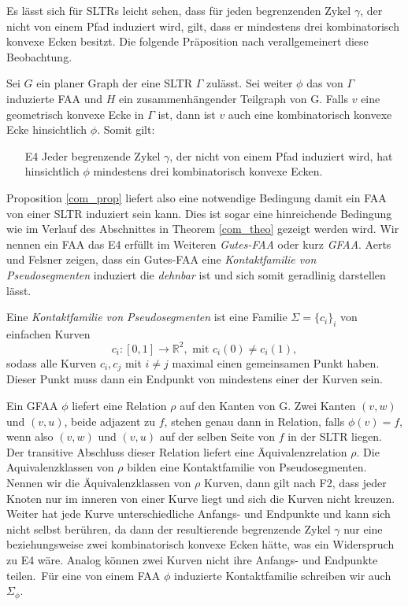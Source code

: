 Es lässt sich für SLTRs leicht sehen, dass für jeden begrenzenden Zykel $\gamma$, der nicht von einem Pfad induziert wird, gilt, dass er mindestens drei kombinatorisch konvexe Ecken besitzt. Die folgende Präposition nach \cite[Prop 2.2, Prop 2.4]{af13} verallgemeinert diese Beobachtung.

\begin{proposition}\label{com_prop}
Sei $G$ ein planer Graph der eine SLTR $\Gamma$ zulässt. Sei weiter $\phi$ das von $\Gamma$ induzierte FAA und $H$ ein zusammenhängender Teilgraph von G. Falls $v$ eine geometrisch konvexe Ecke in $\Gamma$ ist, dann ist $v$ auch eine kombinatorisch konvexe Ecke hinsichtlich $\phi$. Somit gilt:
\begin{itemize}
\item [E4] Jeder begrenzende Zykel $\gamma$, der nicht von einem Pfad induziert wird, hat hinsichtlich $\phi$ mindestens drei kombinatorisch konvexe Ecken.
\end{itemize}

\end{proposition}

Proposition \ref{com_prop} liefert also eine notwendige Bedingung damit ein FAA von einer SLTR induziert sein kann. Dies ist sogar eine hinreichende Bedingung wie im Verlauf des Abschnittes in Theorem \ref{com_theo} gezeigt werden wird. Wir nennen ein FAA das E4 erfüllt im Weiteren \textit{Gutes-FAA} oder kurz \textit{GFAA}. Aerts und Felsner zeigen, dass ein Gutes-FAA eine \textit{Kontaktfamilie von Pseudosegmenten} induziert die \textit{dehnbar} ist und sich somit geradlinig darstellen lässt.

\begin{definition}

Eine \textit{Kontaktfamilie von Pseudosegmenten} ist eine Familie $\Sigma = \{c_i\}_i$ von einfachen Kurven $$c_i:[0,1] \to \mathbb{R}^2, \text{ mit } c_i(0) \neq c_i(1),$$ sodass alle Kurven $c_i,c_j$ mit $i \neq j$ maximal einen gemeinsamen Punkt haben. Dieser Punkt muss dann ein Endpunkt von mindestens einer der Kurven sein.

\end{definition}

Ein GFAA $\phi$ liefert eine Relation $\rho$ auf den Kanten von G. Zwei Kanten $(v,w)$ und $(v,u)$, beide adjazent zu $f$, stehen genau dann in Relation, falls $\phi(v)=f$, wenn also $(v,w)$ und $(v,u)$ auf der selben Seite von $f$ in der SLTR liegen. Der transitive Abschluss dieser Relation liefert eine Äquivalenzrelation $\rho$. Die Aquivalenzklassen von $\rho$ bilden eine Kontaktfamilie von Pseudosegmenten. Nennen wir die Äquivalenzklassen von $\rho$ Kurven, dann gilt nach F2, dass jeder Knoten nur im inneren von einer Kurve liegt und sich die Kurven nicht kreuzen. Weiter hat jede Kurve unterschiedliche Anfangs- und Endpunkte und kann sich nicht selbst berühren, da dann der resultierende begrenzende Zykel $\gamma$ nur eine beziehungsweise zwei kombinatorisch konvexe Ecken hätte, was ein Widerspruch zu E4 wäre. Analog können zwei Kurven nicht ihre Anfangs- und Endpunkte teilen.\
Für eine von einem FAA $\phi$ induzierte Kontaktfamilie schreiben wir auch $\Sigma_{\phi}$.

